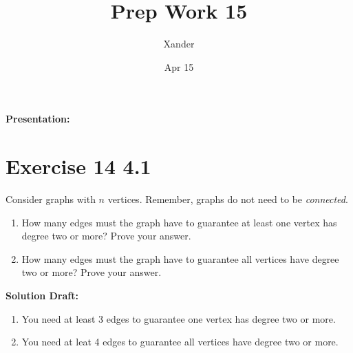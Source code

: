 \documentclass{article}
\title{Prep Work 15}
\author{Xander}
\date{Apr 15}
\begin{document}
\maketitle
\noindent\textbf{Presentation: } 



\section*{Exercise 14 4.1}  

Consider graphs with \(n\) vertices.  Remember, graphs do not need to be \emph{connected}.%
\begin{enumerate}[label= (\alph*)]
\item{}How many edges must the graph have to guarantee at least one vertex has degree two or more?  Prove your answer.%
\item{}How many edges must the graph have to guarantee all vertices have degree two or more?  Prove your answer.%
\end{enumerate}

\vspace{0.5cm}
\noindent\textbf{Solution Draft:} 
\vspace{0.2cm}

\begin{enumerate}[label= (\alph*)]
    \item You need at least 3 edges to guarantee one vertex has degree two or more.
    
    \item You need at leat 4 edges to guarantee all vertices have degree two or more.
    
\end{enumerate}
\end{document}
